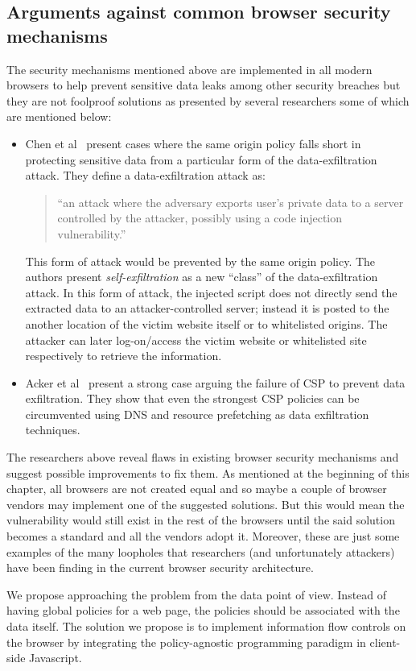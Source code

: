 \subsection{Arguments against common browser security mechanisms \label{sec:against}}
The security mechanisms mentioned above are implemented in all modern browsers to
help prevent sensitive data leaks among other security breaches but they are not
foolproof solutions as presented by several researchers some of which are mentioned
below:
\begin{itemize}
  \item Chen et al~\cite{SelfExfil} present cases where the same origin policy falls short
  in protecting sensitive data from a particular form of the data-exfiltration attack.
  They define a data-exfiltration attack as:

  \begin{quotation}
    ``an attack where the adversary exports user's private data to a server controlled
    by the attacker, possibly using a code injection vulnerability.''
  \end{quotation}
  This form of attack would be prevented by the same origin policy. The authors present
  \textit{self-exfiltration} as a new ``class'' of the data-exfiltration attack. In
  this form of attack, the injected script does not directly send the extracted data
  to an attacker-controlled server; instead it is posted to the another location
  of the victim website itself or to whitelisted origins. The attacker can later
  log-on/access the victim website or whitelisted site respectively to retrieve the
  information.

  \item Acker et al~\cite{DataExfilCSP} present a strong case arguing the failure of
  CSP to prevent data exfiltration. They show that even the strongest CSP policies
  can be circumvented using DNS and resource prefetching as data exfiltration
  techniques.
\end{itemize}
The researchers above reveal flaws in existing browser security mechanisms and suggest
possible improvements to fix them. As mentioned at the beginning of this chapter,
all browsers are not created equal and so maybe a couple of browser vendors may
implement one of the suggested solutions. But this would mean the vulnerability
would still exist in the rest of the browsers until the said solution becomes a
standard and all the vendors adopt it. Moreover, these are just some examples of
the many loopholes that researchers (and unfortunately attackers) have been finding
in the current browser security architecture.

We propose approaching the problem from the data point of view. Instead of having
global policies for a web page, the policies should be associated with the data
itself. The solution we propose is to implement information flow controls on the
browser by integrating the policy-agnostic programming paradigm in client-side Javascript.

